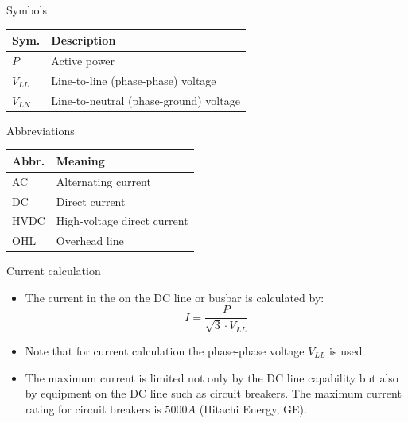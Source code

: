 

\begin{frame}{Symbols}
  \renewcommand{\arraystretch}{1.3}
  \begin{tabular}{@{}p{1.3cm}p{9.0cm}@{}}
    \textbf{Sym.} & \textbf{Description} \\
    \hline
    $P$        & Active power \\
    $V_{LL}$   & Line-to-line (phase-phase) voltage \\
    $V_{LN}$   & Line-to-neutral (phase-ground) voltage \\
  \end{tabular}
\end{frame}

\begin{frame}{Abbreviations}
  \renewcommand{\arraystretch}{1.3}
  \begin{tabular}{@{}p{1.5cm}p{9.0cm}@{}}
    \textbf{Abbr.} & \textbf{Meaning} \\
    \hline
    AC   & Alternating current \\
    DC   & Direct current \\
    HVDC & High-voltage direct current \\
    OHL  & Overhead line \\
  \end{tabular}
\end{frame}


\begin{frame}{Current calculation}
  \begin{itemize}
    \setlength{\itemsep}{0.5em}
    \item The current in the on the DC line or busbar is calculated by:
    \[ I = \frac{P}{\sqrt{3}\cdot V_{LL}} \]
    \item Note that for current calculation the phase-phase voltage $V_{LL}$ is used
    \item The maximum current is limited not only by the DC line capability but also by equipment on the DC line such as circuit breakers. 
    The maximum current rating for circuit breakers is $5000A$ (Hitachi Energy, GE).

  \end{itemize}
\end{frame}